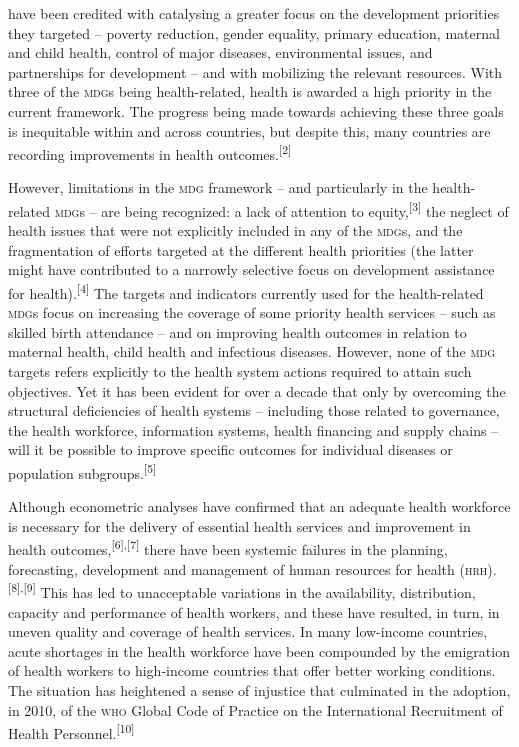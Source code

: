 \documentclass{article}
\begin{document}
have been credited with catalysing a greater focus on the development priorities
they targeted
– poverty reduction, gender equality, primary education, maternal and child
health, control
of major diseases, environmental issues, and partnerships for development – and
with
mobilizing the relevant resources. With three of the \textsc{mdg}s being health-related,
health is awarded a
high priority in the current framework. The progress being made towards
achieving these three goals
is inequitable within and across countries, but despite this, many countries are
recording
improvements in health outcomes.\textsuperscript{[}\textsuperscript{2}\textsuperscript{]}

However, limitations in the \textsc{mdg} framework – and particularly in the
health-related \textsc{mdg}s
– are being recognized: a lack of attention to
equity,\textsuperscript{[}\textsuperscript{3}\textsuperscript{]}
the neglect of health issues that were not explicitly included in any of the
\textsc{mdg}s, and the fragmentation of efforts targeted at the different health
priorities (the latter might
have contributed to a narrowly selective focus on development assistance for
health).\textsuperscript{[}\textsuperscript{4}\textsuperscript{]}
The targets and indicators currently used for the
health-related \textsc{mdg}s focus on increasing the coverage of some priority health
services – such
as skilled birth attendance – and on improving health outcomes in relation to
maternal
health, child health and infectious diseases. However, none of the \textsc{mdg} targets
refers explicitly to
the health system actions required to attain such objectives. Yet it has been
evident for over a
decade that only by overcoming the structural deficiencies of health systems –
including
those related to governance, the health workforce, information systems, health
financing and supply
chains – will it be possible to improve specific outcomes for individual
diseases or
population subgroups.\textsuperscript{[}\textsuperscript{5}\textsuperscript{]}

Although econometric analyses have confirmed that an adequate health workforce
is necessary for
the delivery of essential health services and improvement in health
outcomes,\textsuperscript{[}\textsuperscript{6}\textsuperscript{]}\textsuperscript{,}\textsuperscript{[}\textsuperscript{7}\textsuperscript{]}
there
have been systemic failures in the planning, forecasting, development and
management of human
resources for health (\textsc{hrh}).\textsuperscript{[}\textsuperscript{8}\textsuperscript{]}\textsuperscript{,}\textsuperscript{[}\textsuperscript{9}\textsuperscript{]}
This has led to unacceptable variations in the
availability, distribution, capacity and performance of health workers, and
these have resulted, in
turn, in uneven quality and coverage of health services. In many low-income
countries, acute
shortages in the health workforce have been compounded by the emigration of
health workers to
high-income countries that offer better working conditions. The situation has
heightened a sense of
injustice that culminated in the adoption, in 2010, of the \textsc{who} Global Code of
Practice on the
International Recruitment of Health
Personnel.\textsuperscript{[}\textsuperscript{10}\textsuperscript{]}
\end{document}
